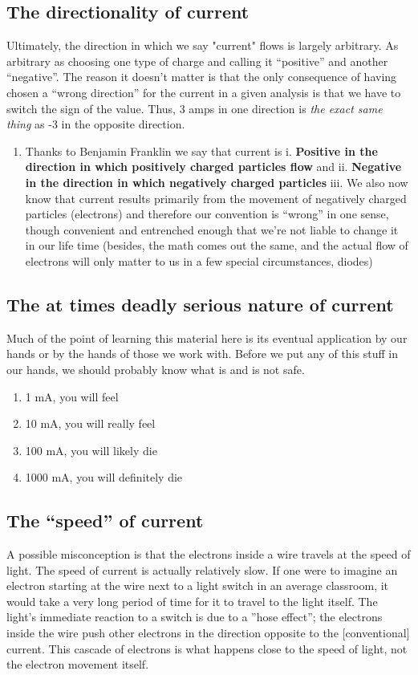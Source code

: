 \documentclass[11pt]{book}
\begin{document}
\subsection{The directionality of current}
Ultimately, the direction in which we say "current" flows is largely arbitrary. As arbitrary as choosing one type of charge and calling it ``positive'' and another ``negative''. The reason it doesn't matter is that the only consequence of having chosen a ``wrong direction'' for the current in a given analysis is that we have to switch the sign of the value. Thus, 3 amps in one direction is \textit{the exact same thing }as -3 in the opposite direction.
\begin{enumerate}
	\item Thanks to Benjamin Franklin we say that current is 
	\subitem i.	\textbf{Positive in the direction in which positively charged particles flow} and 
	\subitem ii.	\textbf{Negative in the direction in which negatively charged particles}
	\subitem iii.	We also now know that current results primarily from the movement of negatively charged particles (electrons) and therefore our convention is “wrong” in one sense, though convenient and entrenched enough that we’re not liable to change it in our life time (besides, the math comes out the same, and the actual flow of electrons will only matter to us in a few special circumstances, diodes)
\end{enumerate}


\subsection{The at times deadly serious nature of current}
Much of the point of learning this material here is its eventual application by our hands or by the hands of those we work with. Before we put any of this stuff in our hands, we should probably know what is and is not safe.
\begin{enumerate}
	\item 1 mA, you will feel
	\item 10 mA, you will really feel
	\item 100 mA, you will likely die
	\item 1000 mA, you will definitely die
\end{enumerate}


\subsection{The ``speed'' of current}
A possible misconception is that the electrons inside a wire travels at the speed of light. The speed of current is actually relatively slow. If one were to imagine an electron starting at the wire next to a light switch in an average classroom, it would take a very long period of time for it to travel to the light itself. The light's immediate reaction to a switch is due to a ''hose effect''; the electrons inside the wire push other electrons in the direction opposite to the [conventional] current. This cascade of electrons is what happens close to the speed of light, not the electron movement itself.
\end{document}
